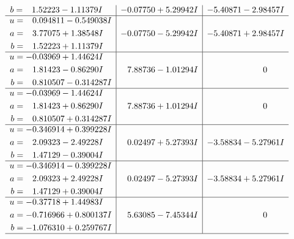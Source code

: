 \documentclass[1p]{elsarticle_modified}
\theoremstyle{definition}
\begin{document}
$$\begin{array}{c|c|c}
\begin{aligned}
b &= \phantom{-}1.52223 - 1.11379 I\end{aligned}
 & -0.07750 + 5.29942 I & -5.40871 - 2.98457 I \\ \hline\begin{aligned}
u &= \phantom{-}0.094811 - 0.549038 I \\
a &= \phantom{-}3.77075 + 1.38548 I \\
b &= \phantom{-}1.52223 + 1.11379 I\end{aligned}
 & -0.07750 - 5.29942 I & -5.40871 + 2.98457 I \\ \hline\begin{aligned}
u &= -0.03969 + 1.44624 I \\
a &= \phantom{-}1.81423 - 0.86290 I \\
b &= \phantom{-}0.810507 - 0.314287 I\end{aligned}
 & \phantom{-}7.88736 - 1.01294 I & \phantom{-0.000000 } 0 \\ \hline\begin{aligned}
u &= -0.03969 - 1.44624 I \\
a &= \phantom{-}1.81423 + 0.86290 I \\
b &= \phantom{-}0.810507 + 0.314287 I\end{aligned}
 & \phantom{-}7.88736 + 1.01294 I & \phantom{-0.000000 } 0 \\ \hline\begin{aligned}
u &= -0.346914 + 0.399228 I \\
a &= \phantom{-}2.09323 - 2.49228 I \\
b &= \phantom{-}1.47129 - 0.39004 I\end{aligned}
 & \phantom{-}0.02497 + 5.27393 I & -3.58834 - 5.27961 I \\ \hline\begin{aligned}
u &= -0.346914 - 0.399228 I \\
a &= \phantom{-}2.09323 + 2.49228 I \\
b &= \phantom{-}1.47129 + 0.39004 I\end{aligned}
 & \phantom{-}0.02497 - 5.27393 I & -3.58834 + 5.27961 I \\ \hline\begin{aligned}
u &= -0.37718 + 1.44983 I \\
a &= -0.716966 + 0.800137 I \\
b &= -1.076310 + 0.259767 I\end{aligned}
 & \phantom{-}5.63085 - 7.45344 I & \phantom{-0.000000 } 0\\
 \hline 
 \end{array}$$\newpage$$\begin{array}{c|c|c}  

\end{array}$$
\end{document}
